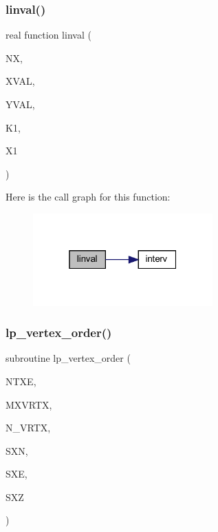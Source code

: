 \mbox{\label{Marco_8f90_accb3ec8ce6fe855a60b0c1959fc6e2c8}} 
\subsubsection{\texorpdfstring{linval()}{linval()}}
{\footnotesize\ttfamily real function linval (\begin{DoxyParamCaption}\item[{integer, intent(in)}]{NX,  }\item[{real, dimension(nx), intent(in)}]{X\+V\+AL,  }\item[{real, dimension(nx,3), intent(in)}]{Y\+V\+AL,  }\item[{integer}]{K1,  }\item[{real, intent(in)}]{X1 }\end{DoxyParamCaption})}

Here is the call graph for this function\+:
\nopagebreak
\begin{figure}[H]
\begin{center}
\leavevmode
\includegraphics[width=196pt]{Marco_8f90_accb3ec8ce6fe855a60b0c1959fc6e2c8_cgraph}
\end{center}
\end{figure}
\mbox{\label{Marco_8f90_acbb31184506555aa865f529467a59933}} 
\subsubsection{\texorpdfstring{lp\+\_\+vertex\+\_\+order()}{lp\_vertex\_order()}}
{\footnotesize\ttfamily subroutine lp\+\_\+vertex\+\_\+order (\begin{DoxyParamCaption}\item[{integer}]{N\+T\+XE,  }\item[{integer}]{M\+X\+V\+R\+TX,  }\item[{integer, dimension(ntxe)}]{N\+\_\+\+V\+R\+TX,  }\item[{real, dimension (mxvrtx,ntxe)}]{S\+XN,  }\item[{real, dimension (mxvrtx,ntxe)}]{S\+XE,  }\item[{real, dimension (mxvrtx,ntxe)}]{S\+XZ }\end{DoxyParamCaption})}

